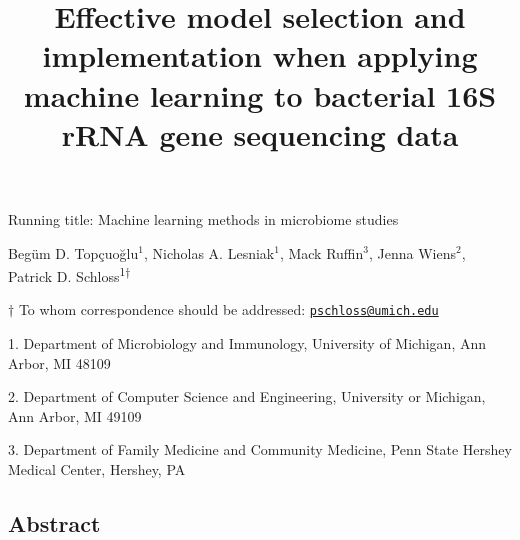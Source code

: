 \documentclass[11pt,]{article}
\title{\textbf{Effective model selection and implementation when applying
machine learning to bacterial 16S rRNA gene sequencing data}}
\author{}
\date{}
\begin{document}
\maketitle

\vspace{35mm}

Running title: Machine learning methods in microbiome studies

\vspace{35mm}

Begüm D. Topçuoğlu\({^1}\), Nicholas A. Lesniak\({^1}\), Mack
Ruffin\({^3}\), Jenna Wiens\({^2}\), Patrick D.
Schloss\textsuperscript{1\(\dagger\)}

\vspace{40mm}

\(\dagger\) To whom correspondence should be addressed:
\href{mailto:pschloss@umich.edu}{\nolinkurl{pschloss@umich.edu}}

1. Department of Microbiology and Immunology, University of Michigan,
Ann Arbor, MI 48109

2. Department of Computer Science and Engineering, University or
Michigan, Ann Arbor, MI 49109

3. Department of Family Medicine and Community Medicine, Penn State
Hershey Medical Center, Hershey, PA

\newpage

\linenumbers

\subsection{Abstract}\label{abstract}
\end{document}

